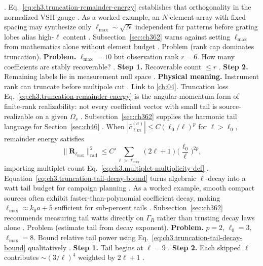 \cite{harrington2001}. Eq.~\eqref{eq:ch3.truncation-remainder-energy} establishes that orthogonality in the
normalized VSH gauge \cite{hansen1988}.
As a worked example, an \(N\)-element array with fixed spacing may synthesize only \(\ell_{\max}\sim\sqrt{N}\) independent far patterns
before grating lobes alias high-\(\ell\) content \cite{harrington2001}. Subsection~\ref{sec:ch362} warns
against setting \(\ell_{\max}\) from mathematics alone without element budget \cite{hansen1988}.
Problem (rank cap dominates truncation). \textbf{Problem.} \(\ell_{\max}=10\) but observation rank \(r=6\). How many coefficients are stably recoverable?
\cite{harrington2001}.
\textbf{Step 1.} Recoverable count \(\le r\) \cite{harrington2001}.
\textbf{Step 2.} Remaining labels lie in measurement null space \cite{stratton1941}.
\textbf{Physical meaning.} Instrument rank can truncate before multipole cut \cite{harrington2001}.
Link to \ref{ch:04}. Truncation loss Eq.~\eqref{eq:ch3.truncation-remainder-energy} is the angular-momentum form of finite-rank
realizability: not every coefficient vector with small tail is source-realizable on a given \(\Omega_{s}\)
\cite{harrington2001}. Subsection~\ref{sec:ch362} supplies the harmonic tail language for
Section~\ref{sec:ch46} \cite{harrington2001}.
When \(|\widehat{c}_{\ell m}^{(\sigma)}|\le C(\ell_{0}/\ell)^{p}\) for \(\ell>\ell_{0}\), remainder energy satisfies
\begin{equation}
\label{eq:ch3.truncation-tail-decay-bound}
\|\mathbf{R}_{\ell_{\max}}\|_{\mathrm{rad}}^{2}
\le
C'\sum_{\ell>\ell_{\max}}(2\ell+1)\Big(\frac{\ell_{0}}{\ell}\Big)^{2p},
\end{equation}
importing multiplet count Eq.~\eqref{eq:ch3.multiplet-multiplicity-def} \cite{hansen1988}.
Equation~\eqref{eq:ch3.truncation-tail-decay-bound} turns algebraic \(\ell\)-decay into a watt tail budget for campaign
planning \cite{poynting1884}.
As a worked example, smooth compact sources often exhibit faster-than-polynomial coefficient decay, making \(\ell_{\max}\approx k_{0}a+5\)
sufficient for sub-percent tails \cite{stratton1941}. Subsection~\ref{sec:ch362} recommends measuring tail
watts directly on \(\Gamma_R\) rather than trusting decay laws alone \cite{harrington2001}.
Problem (estimate tail from decay exponent). \textbf{Problem.} \(p=2\), \(\ell_{0}=3\), \(\ell_{\max}=8\). Bound relative tail power using
Eq.~\eqref{eq:ch3.truncation-tail-decay-bound} qualitatively \cite{harrington2001}.
\textbf{Step 1.} Tail begins at \(\ell=9\) \cite{hansen1988}.
\textbf{Step 2.} Each skipped \(\ell\) contributes \(\sim(3/\ell)^{4}\) weighted by \(2\ell+1\) \cite{jackson1999}.
